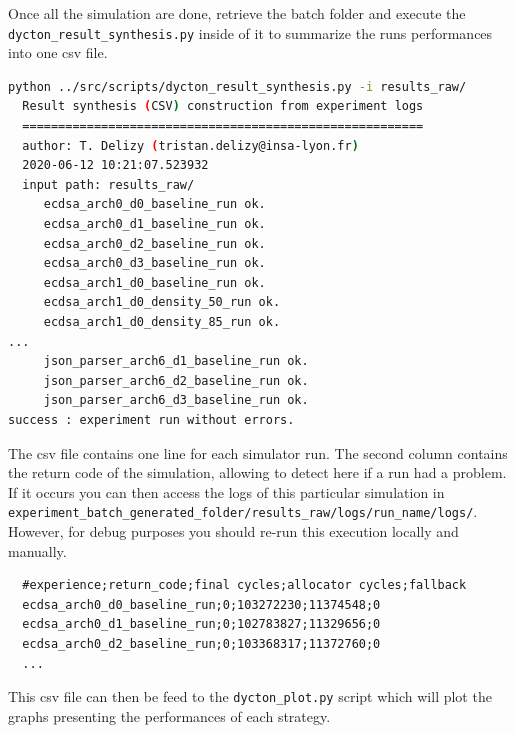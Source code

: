 \documentclass[10 pt]{article}
\begin{document}
\bigskip
Once all the simulation are done, retrieve the batch folder and execute the \lstinline{dycton_result_synthesis.py} inside of it to summarize the runs performances into one csv file.

\begin{lstlisting}[language=bash]
  python ../src/scripts/dycton_result_synthesis.py -i results_raw/
  Result synthesis (CSV) construction from experiment logs
  ========================================================
  author: T. Delizy (tristan.delizy@insa-lyon.fr)
  2020-06-12 10:21:07.523932
  input path: results_raw/
  	 ecdsa_arch0_d0_baseline_run ok.
  	 ecdsa_arch0_d1_baseline_run ok.
  	 ecdsa_arch0_d2_baseline_run ok.
  	 ecdsa_arch0_d3_baseline_run ok.
  	 ecdsa_arch1_d0_baseline_run ok.
  	 ecdsa_arch1_d0_density_50_run ok.
  	 ecdsa_arch1_d0_density_85_run ok.
...
     json_parser_arch6_d1_baseline_run ok.
     json_parser_arch6_d2_baseline_run ok.
     json_parser_arch6_d3_baseline_run ok.
success : experiment run without errors.
\end{lstlisting}


The csv file contains one line for each simulator run.
The second column contains the return code of the simulation, allowing to detect here if a run had a problem.
If it occurs you can then access the logs of this particular simulation in \lstinline{experiment_batch_generated_folder/results_raw/logs/run_name/logs/}.
However, for debug purposes you should re-run this execution locally and manually.

\begin{lstlisting}
  #experience;return_code;final cycles;allocator cycles;fallback
  ecdsa_arch0_d0_baseline_run;0;103272230;11374548;0
  ecdsa_arch0_d1_baseline_run;0;102783827;11329656;0
  ecdsa_arch0_d2_baseline_run;0;103368317;11372760;0
  ...
\end{lstlisting}

This csv file can then be feed to the \lstinline{dycton_plot.py} script which will plot the graphs presenting the performances of each strategy.
\end{document}
